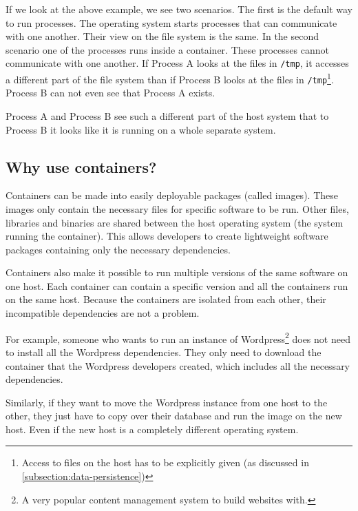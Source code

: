 If we look at the above example, we see two scenarios. The first is the default way to run processes. The operating system starts processes that can communicate with one another. Their view on the file system is the same.
In the second scenario one of the processes runs inside a container. These processes cannot communicate with one another. If Process A looks at the files in \lstinline{/tmp}, it accesses a different part of the file system than if Process B looks at the files in \lstinline{/tmp}\footnote{Access to files on the host has to be explicitly given (as discussed in \autoref{subsection:data-persistence})}. Process B can not even see that Process A exists.

\hfill

Process A and Process B see such a different part of the host system that to Process B it looks like it is running on a whole separate system.

\subsection{Why use containers?}

Containers can be made into easily deployable packages (called images). These images only contain the necessary files for specific software to be run. Other files, libraries and binaries are shared between the host operating system (the system running the container). This allows developers to create lightweight software packages containing only the necessary dependencies.

\hfill

Containers also make it possible to run multiple versions of the same software on one host. Each container can contain a specific version and all the containers run on the same host. Because the containers are isolated from each other, their incompatible dependencies are not a problem.

\hfill

For example, someone who wants to run an instance of Wordpress\footnote{A very popular content management system to build websites with.} does not need to install all the Wordpress dependencies. They only need to download the container that the Wordpress developers created, which includes all the necessary dependencies.

Similarly, if they want to move the Wordpress instance from one host to the other, they just have to copy over their database and run the image on the new host. Even if the new host is a completely different operating system.

